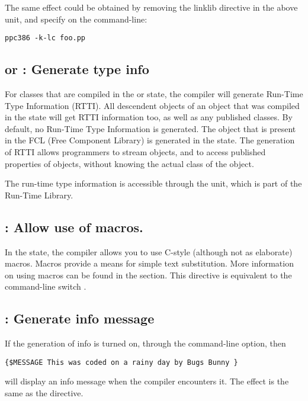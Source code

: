 \documentclass{report}
\begin{document}
The same effect could be obtained by removing the linklib directive in the
above unit, and specify  on the command-line:
\begin{verbatim}
ppc386 -k-lc foo.pp
\end{verbatim}

\subsection{ or  : Generate type info}

For classes that are compiled in the  or 
state, the compiler will generate Run-Time Type Information (RTTI). All
descendent objects of an object that was compiled in the  state
will get RTTI information too, as well as any published classes.
By default, no Run-Time Type Information is generated. The 
object that is present in the FCL (Free Component Library) is generated in
the  state. The generation of RTTI allows programmers to
stream objects, and to access published properties of objects, without
knowing the actual class of the object.

The run-time type information is accessible through the  unit,
which is part of the \fpc Run-Time Library.

\subsection{ : Allow use of macros.}

In the  state, the compiler allows you to use C-style
(although not as elaborate) macros. Macros provide a means for simple text
substitution. More information on using macros can be found in the 
 section. This directive is equivalent to the command-line
switch .
 
\subsection{ : Generate info message}

If the generation of info is turned on, through the  command-line
option, then
\begin{verbatim}
{$MESSAGE This was coded on a rainy day by Bugs Bunny }
\end{verbatim}
will display an info message when the compiler encounters it. The effect is
the same as the  directive.
\end{document}
